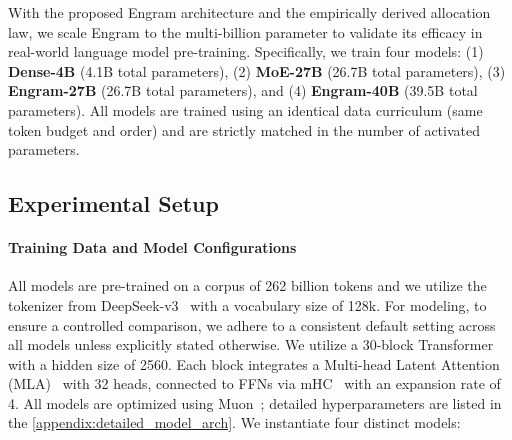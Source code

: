 With the proposed Engram architecture and the empirically derived allocation law, we scale Engram to the multi-billion parameter to validate its efficacy in real-world language model pre-training. Specifically, we train four models:
(1) \textbf{Dense-4B} (4.1B total parameters),
(2) \textbf{MoE-27B} (26.7B total parameters),
(3) \textbf{Engram-27B} (26.7B total parameters), and
(4) \textbf{Engram-40B} (39.5B total parameters).
All models are trained using an identical data curriculum (same token budget and order) and are strictly matched in the number of activated parameters.

\subsection{Experimental Setup}

\paragraph{Training Data and Model Configurations} All models are pre-trained on a corpus of 262 billion tokens and we utilize the tokenizer from DeepSeek-v3~\citep{liu2024deepseek} with a vocabulary size of 128k. For modeling, to ensure a controlled comparison, we adhere to a consistent default setting across all models unless explicitly stated otherwise. We utilize a 30-block Transformer with a hidden size of 2560. Each block integrates a Multi-head Latent Attention (MLA)~\citep{deepseekai2024deepseekv2strongeconomicalefficient} with 32 heads, connected to FFNs via mHC~\citep{xie2025mhcmanifoldconstrainedhyperconnections} with an expansion rate of 4. All models are optimized using Muon~\citep{jordan2024muon,liu2025muon}; detailed hyperparameters are listed in the \autoref{appendix:detailed_model_arch}. We instantiate four distinct models:


